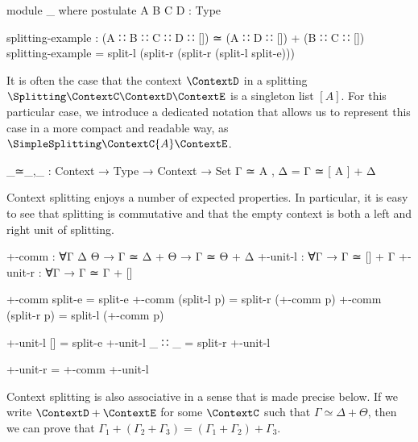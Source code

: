 \begin{code}[hide]
module _ where
  postulate A B C D : Type
\end{code}
\begin{code}
  splitting-example : (A ∷ B ∷ C ∷ D ∷ []) ≃ (A ∷ D ∷ []) + (B ∷ C ∷ [])
  splitting-example = split-l (split-r (split-r (split-l split-e)))
\end{code}

It is often the case that the context $\ContextD$ in a splitting
$\Splitting\ContextC\ContextD\ContextE$ is a singleton list $[A]$. For this
particular case, we introduce a dedicated notation that allows us to represent
this case in a more compact and readable way, as
$\SimpleSplitting\ContextC{A}\ContextE$.

\begin{code}
_≃_,_ : Context → Type → Context → Set
Γ ≃ A , Δ = Γ ≃ [ A ] + Δ
\end{code}

Context splitting enjoys a number of expected properties. In particular, it is
easy to see that splitting is commutative and that the empty context is both a
left and right unit of splitting.

\begin{code}
+-comm    : ∀{Γ Δ Θ} → Γ ≃ Δ + Θ → Γ ≃ Θ + Δ
+-unit-l  : ∀{Γ} → Γ ≃ [] + Γ
+-unit-r  : ∀{Γ} → Γ ≃ Γ + []
\end{code}
\begin{code}[hide]
+-comm split-e = split-e
+-comm (split-l p) = split-r (+-comm p)
+-comm (split-r p) = split-l (+-comm p)

+-unit-l {[]} = split-e
+-unit-l {_ ∷ _} = split-r +-unit-l

+-unit-r = +-comm +-unit-l
\end{code}

Context splitting is also associative in a sense that is made precise below. If
we write $\ContextD + \ContextE$ for some $\ContextC$ such that $Γ ≃ Δ + Θ$, then
we can prove that $Γ_1 + (Γ_2 + Γ_3) = (Γ_1 + Γ_2) + Γ_3$.

